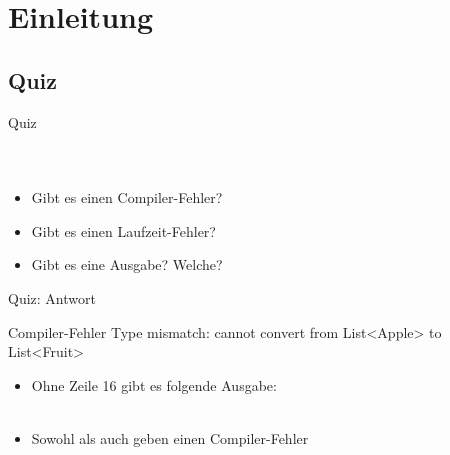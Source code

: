 \documentclass[usepdftitle=false,hyperref={pdfpagelabels=false}]{beamer}
\begin{document}
\title{\titleText}
\subtitle{Wildcards, equals(), Exceptions}
\author{\tutor}
\date{\today}
\subject{Programmieren}

\frame{\titlepage}


\section{Einleitung}
\subsection{Quiz}
\begin{frame}{Quiz}
    \begin{minipage}[b]{0.45\linewidth}
        \inputminted[linenos=true, numbersep=5pt, tabsize=4, fontsize=\tiny]{java}{Main.java}
    \end{minipage}
    \hspace{0.5cm}
    \begin{minipage}[b]{0.45\linewidth}
        \inputminted[linenos=false, numbersep=5pt, tabsize=4, fontsize=\tiny, label=Fruit.java, frame=lines, firstline=1, lastline=1]{java}{Fruit.java}
        \inputminted[linenos=false, numbersep=5pt, tabsize=4, fontsize=\tiny, label=Apple.java, frame=lines, firstline=1, lastline=1]{java}{Apple.java}
        \begin{itemize}
            \item Gibt es einen Compiler-Fehler?
            \item Gibt es einen Laufzeit-Fehler?
            \item Gibt es eine Ausgabe? Welche?
        \end{itemize}
    \end{minipage}
\end{frame}

\begin{frame}{Quiz: Antwort}
    \begin{block}{Compiler-Fehler}
        Type mismatch: cannot convert from List<Apple> to List<Fruit>
    \end{block}

    \begin{itemize}[<+->]
        \item Ohne Zeile 16 gibt es folgende Ausgabe:\\
              \\
        \item Sowohl  als auch 
              geben einen Compiler-Fehler
    \end{itemize}
\end{frame}
\end{document}
